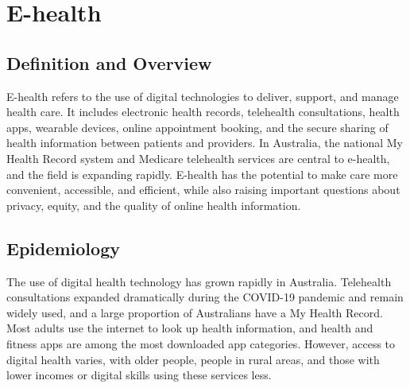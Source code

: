 \chapter{E-health}

\section*{Definition and Overview}
E-health refers to the use of digital technologies to deliver, support, and manage health care. It includes electronic health records, telehealth consultations, health apps, wearable devices, online appointment booking, and the secure sharing of health information between patients and providers. In Australia, the national My Health Record system and Medicare telehealth services are central to e-health, and the field is expanding rapidly. E-health has the potential to make care more convenient, accessible, and efficient, while also raising important questions about privacy, equity, and the quality of online health information.

\section*{Epidemiology}
The use of digital health technology has grown rapidly in Australia. Telehealth consultations expanded dramatically during the COVID-19 pandemic and remain widely used, and a large proportion of Australians have a My Health Record. Most adults use the internet to look up health information, and health and fitness apps are among the most downloaded app categories. However, access to digital health varies, with older people, people in rural areas, and those with lower incomes or digital skills using these services less.

